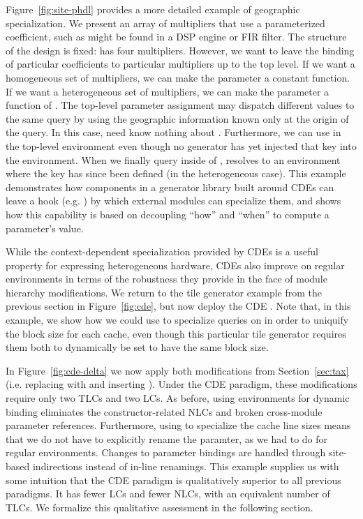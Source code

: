 Figure~\ref{fig:site-phdl} provides a more detailed example of geographic specialization.
We present an array of multipliers that use a parameterized coefficient, such as might be found in a DSP engine or FIR filter.
The structure of the design is fixed:  has four multipliers.
However, we want to leave the binding of particular coefficients to particular multipliers up to the top level.
If we want a homogeneous set of multipliers, we can make the  parameter a constant function.
If we want a heterogeneous set of multipliers, we can make the  parameter a function of .
The top-level parameter assignment may dispatch different values to the same query by using the geographic information known only at the origin of the query. 
In this case,  need know nothing about .
Furthermore, we can use  in the top-level environment even though no generator has yet injected that key into the environment.
When we finally query  inside of ,  resolves to an environment where the  key has since been defined (in the heterogeneous case).
This example demonstrates how components in a generator library built around CDEs can leave a hook (e.g. ) by which external modules can specialize them,
and shows how this capability is based on decoupling ``how'' and ``when'' to compute a parameter's value. 

While the context-dependent specialization provided by CDEs is a useful property for expressing heterogeneous hardware,
CDEs also improve on regular environments in terms of the robustness they provide in the face of module hierarchy modifications.
We return to the tile generator example from the previous section in Figure~\ref{fig:cde}, but now deploy the CDE .
Note that, in this example, we show how we could use
 to specialize queries on  in order to uniquify the block size for each cache,
even though this particular tile generator requires them both to dynamically be set to have the same block size.

In Figure~\ref{fig:cde-delta} we now apply both modifications from Section~\ref{sec:tax} (i.e. replacing  with  and inserting ).
Under the CDE paradigm, these modifications require only two TLCs and two LCs.
As before, using environments for dynamic binding eliminates the constructor-related NLCs and broken cross-module parameter references.
Furthermore, using  to specialize the cache line sizes means that we do not have to explicitly rename the  paramter, as we had to do for regular environments.
Changes to parameter bindings are handled through site-based indirections instead of in-line renamings.
This example supplies us with some intuition that the CDE paradigm is qualitatively superior to all previous paradigms.
It has fewer LCs and fewer NLCs, with an equivalent number of TLCs.
We formalize this qualitative assessment in the following section.

